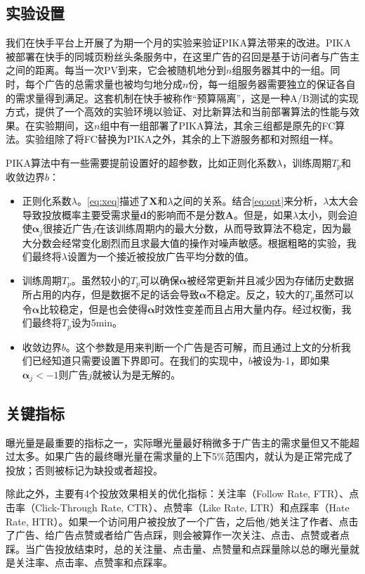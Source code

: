 \subsection{实验设置}

我们在快手平台上开展了为期一个月的实验来验证PIKA算法带来的改进。PIKA被部署在快手的同城页粉丝头条服务中，在这里广告的召回是基于访问者与广告主之间的距离。每当一次PV到来，它会被随机地分到$n$组服务器其中的一组。同时，每个广告的总需求量也被均匀地分成$n$份，每一组服务器需要独立的保证各自的需求量得到满足。这套机制在快手被称作“预算隔离”，这是一种A/B测试的实现方式，提供了一个高效的实验环境以验证、对比新算法和当前部署算法的性能与效果。在实验期间，这$n$组中有一组部署了PIKA算法，其余三组都是原先的FC算法。实验组除了将FC替换为PIKA之外，其余的上下游服务都和对照组一样。

 PIKA算法中有一些需要提前设置好的超参数，比如正则化系数$\lambda$，训练周期$T_p$和收敛边界$b$：
 \begin{itemize}
 	\item 正则化系数$\lambda$。\eqref{eq:xeq}描述了$\bm{X}$和$\lambda$之间的关系。结合\eqref{eq:opt}来分析，$\lambda$太大会导致投放概率主要受需求量$\bm{d}$的影响而不是分数$\bm{A}$。但是，如果$\lambda$太小，则会迫使$\bm{\alpha}_j$很接近广告$j$在该训练周期内的最大分数，从而导致算法不稳定，因为最大分数会经常变化剧烈而且求最大值的操作对噪声敏感。根据粗略的实验，我们最终将$\lambda$设置为一个接近被投放广告平均分数的值。
 	\item 训练周期$T_p$。虽然较小的$T_p$可以确保$\bm{\alpha}$被经常更新并且减少因为存储历史数据所占用的内存，但是数据不足的话会导致$\bm{\alpha}$不稳定。反之，较大的$T_p$虽然可以令$\bm{\alpha}$比较稳定，但是也会使得$\bm{\alpha}$时效性变差而且占用大量内存。经过权衡，我们最终将$T_p$设为5min。
 	\item 收敛边界$b$。这个参数是用来判断一个广告是否可解，而且通过上文的分析我们已经知道只需要设置下界即可。在我们的实现中，$b$被设为-1，即如果$\bm{\alpha}_j<-1$则广告$j$就被认为是无解的。
 \end{itemize}

\subsection{关键指标}

曝光量是最重要的指标之一，实际曝光量最好稍微多于广告主的需求量但又不能超过太多。如果广告的最终曝光量在需求量的上下5\%范围内，就认为是正常完成了投放；否则被标记为缺投或者超投。

除此之外，主要有4个投放效果相关的优化指标：关注率（Follow Rate, FTR）、点击率（Click-Through Rate, CTR）、点赞率（Like Rate, LTR）和点踩率（Hate Rate, HTR）。如果一个访问用户被投放了一个广告，之后他/她关注了作者、点击了广告、给广告点赞或者给广告点踩，则会被算作一次关注、点击、点赞或者点踩。当广告投放结束时，总的关注量、点击量、点赞量和点踩量除以总的曝光量就是关注率、点击率、点赞率和点踩率。

